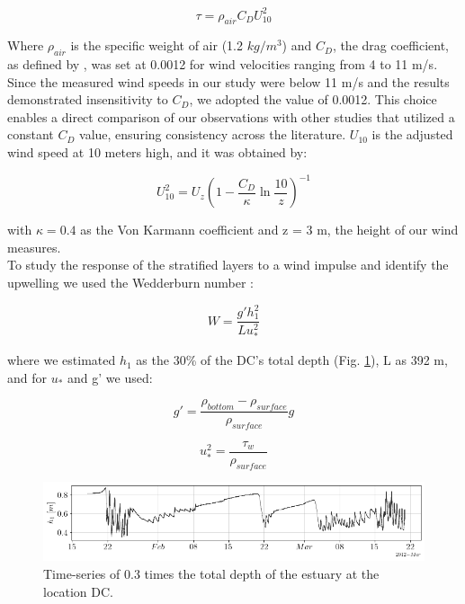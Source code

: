 \documentclass[tesis.tex]{subfiles}
\begin{document}
\begin{equation}
    \tau=\rho_{air} C_D U_{10}^2
    \label{eq: tau}
\end{equation}

Where $\rho_{air}$ is the specific weight of air (1.2 $kg/m^3$) and $C_D$, the drag coefficient, as defined by \cite{large1981open}, was set at 0.0012 for wind velocities ranging from 4 to 11 m/s. Since the measured wind speeds in our study were below 11 m/s and the results demonstrated insensitivity to $C_D$, we adopted the value of 0.0012. This choice enables a direct comparison of our observations with other studies that utilized a constant $C_D$ value, ensuring consistency across the literature. $U_{10}$ is the adjusted wind speed at 10 meters high, and it was obtained by: 

\begin{equation}
    U_{10}^2=U_z(1-\frac{C_D}{\kappa}\ln{\frac{10}{z}})^{-1}
    \label{eq: adjvel}
\end{equation}

with $\kappa=0.4$ as the Von Karmann coefficient and z = 3 m, the height of our wind measures.\\

To study the response of the stratified layers to a wind impulse and identify the upwelling we used the Wedderburn number \citep{Imberger1982}:

\begin{equation}
    W=\frac{g'h_1^2}{Lu_*^2}
    \label{eq: wed}
\end{equation}

where we estimated $h_1$ as the 30\% of the DC's total depth (Fig. \ref{fig:h1}), L as 392 m, and for $u_*$ and g' we used:

\begin{equation}
    g'=\frac{\rho_{bottom}-\rho_{surface}}{\rho_{surface}}g
    \label{eq: redg}
\end{equation}

\begin{equation}
    u_*^2=\frac{\tau_w}{\rho_{surface}}
    \label{eq: ustar}
\end{equation}


\begin{figure}[h!]
    \centering
    \includegraphics[width=\textwidth]{Imagenes/h1.png}
    \caption{Time-series of 0.3 times the total depth of the estuary at the location DC.}
    \label{fig:h1}
\end{figure}
\end{document}
